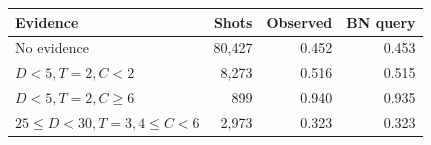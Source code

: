 \begin{tabular}{lrrr}
\toprule
Evidence & Shots & Observed & BN query\\
\midrule
No evidence & 80,427 & 0.452 & 0.453\\
$D<5,T=2,C<2$ & 8,273 & 0.516 & 0.515\\
$D<5,T=2,C\geq6$ & 899 & 0.940 & 0.935\\
$25\leq D<30,T=3,4\leq C<6$ & 2,973 & 0.323 & 0.323\\
\bottomrule
\end{tabular}
